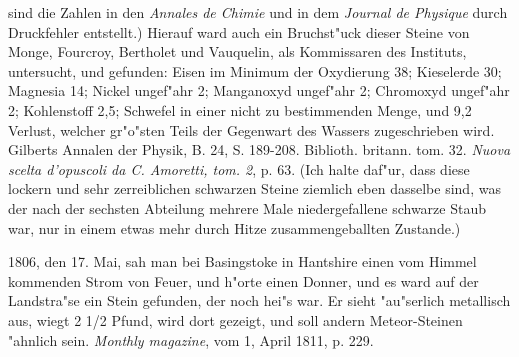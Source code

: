 \documentclass[a4paper, 11pt, oneside, polutonikogreek, german]{article}
\begin{document}
sind die Zahlen in den \emph{Annales de Chimie} und in dem \emph{Journal de Physique} durch Druckfehler entstellt.) Hierauf ward auch ein Bruchst"uck dieser Steine von Monge, Fourcroy, Bertholet und Vauquelin, als Kommissaren des Instituts, untersucht, und gefunden: Eisen im Minimum der Oxydierung 38; Kieselerde 30; Magnesia 14; Nickel ungef"ahr 2; Manganoxyd ungef"ahr 2; Chromoxyd ungef"ahr 2; Kohlenstoff 2,5; Schwefel in einer nicht zu bestimmenden Menge, und 9,2 Verlust, welcher gr"o"sten Teils der Gegenwart des Wassers zugeschrieben wird. Gilberts Annalen der Physik, B. 24, S. 189-208. Biblioth. britann. tom. 32. \emph{Nuova scelta d'opuscoli da C. Amoretti, tom. 2}, p. 63. (Ich halte daf"ur, dass diese lockern und sehr zerreiblichen schwarzen Steine ziemlich eben dasselbe sind, was der nach der sechsten Abteilung mehrere Male niedergefallene schwarze Staub war, nur in einem etwas mehr durch Hitze zusammengeballten Zustande.)

1806, den 17. Mai, sah man bei Basingstoke in Hantshire einen vom Himmel kommenden Strom von Feuer, und h"orte einen Donner, und es ward auf der Landstra"se ein Stein gefunden, der noch hei"s war. Er sieht "au"serlich metallisch aus, wiegt 2 1/2 Pfund, wird dort gezeigt, und soll andern Meteor-Steinen "ahnlich sein. \emph{Monthly magazine}, vom 1, April 1811, p. 229.
\end{document}
